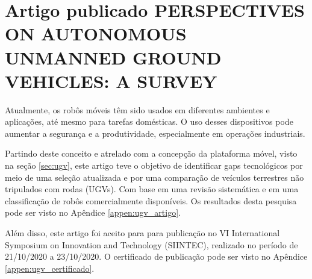 \section{Artigo publicado PERSPECTIVES ON AUTONOMOUS UNMANNED GROUND
VEHICLES: A SURVEY}

Atualmente, os robôs móveis têm sido usados em diferentes ambientes e
aplicações, até mesmo para tarefas domésticas. O uso desses dispositivos pode aumentar a segurança e a produtividade, especialmente em operações industriais.

Partindo deste conceito e atrelado com a concepção da plataforma móvel,  visto na seção \ref{sec:ugv}, este artigo teve o objetivo de identificar gaps tecnológicos por meio de uma seleção atualizada
e por uma comparação de veículos terrestres não tripulados com rodas (UGVs). Com base em uma revisão sistemática e em uma classificação de robôs comercialmente disponíveis. Os resultados desta pesquisa pode ser visto no Apêndice \ref{appen:ugv_artigo}. 

Além disso, este artigo foi aceito para para publicação no
VI International Symposium on Innovation and Technology (SIINTEC), realizado no período de 21/10/2020 a 23/10/2020. O certificado de publicação pode ser visto no Apêndice \ref{appen:ugv_certificado}.